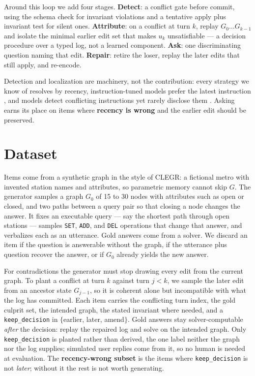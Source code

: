 \documentclass[11pt]{article}
\begin{document}
Around this loop we add four stages. \textbf{Detect}: a conflict gate before
commit, using the schema check for invariant violations and a tentative apply plus
invariant test for silent ones. \textbf{Attribute}: on a conflict at turn $k$,
replay $G_0 \ldots G_{k-1}$ and isolate the minimal earlier edit set that makes
$u_k$ unsatisfiable --- a decision procedure over a typed log, not a learned
component. \textbf{Ask}: one discriminating question naming that edit.
\textbf{Repair}: retire the loser, replay the later edits that still apply, and
re-encode.

Detection and localization are machinery, not the contribution: every strategy we
know of resolves by recency, instruction-tuned models prefer the latest
instruction \citep{zhang-2025-iheval}, and models detect conflicting instructions
yet rarely disclose them \citep{he-2026-coninstruct}. Asking earns its place on
items where \textbf{recency is wrong} and the earlier edit should be preserved.

\section{Dataset}

Items come from a synthetic graph in the style of CLEGR: a fictional metro with
invented station names and attributes, so parametric memory cannot skip $G$. The
generator samples a graph $G_0$ of 15 to 30 nodes with
attributes such as open or closed, and two paths between a query pair so that
closing a node changes the answer. It fixes an executable query --- say the
shortest path through open stations --- samples \texttt{SET},
\texttt{ADD}, and \texttt{DEL} operations that change that answer, and verbalizes
each as an utterance. Gold answers come from a solver. We discard an item if the
question is answerable without the graph, if the utterance plus question recover
the answer, or if $G_0$ already yields the new answer.

For contradictions the generator must stop drawing every edit from the current
graph. To plant a conflict at turn $k$ against turn $j < k$, we sample the later
edit from an ancestor state $G_{j-1}$, so it is coherent alone but incompatible
with what the log has committed. Each item carries the
conflicting turn index, the gold culprit set, the intended graph, the stated
invariant where needed, and a \texttt{keep\_decision} in $\{$earlier, later,
amend$\}$. Gold answers stay solver-computable \emph{after} the decision: replay
the repaired log and solve on the intended graph. Only \texttt{keep\_decision} is
planted rather than derived, the one label neither the graph nor the log supplies;
simulated user replies come from it, so no human is needed at evaluation. The \textbf{recency-wrong subset} is the items where
\texttt{keep\_decision} is not \emph{later}; without it the rest is not worth
generating.
\end{document}
